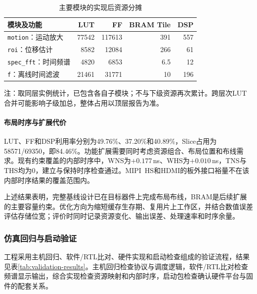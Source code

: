 \documentclass[UTF8,a4paper,zihao=-4,fontset=none]{ctexart}
\renewcommand{\small}{\fontsize{10.5pt}{13pt}\selectfont}
\numberwithin{figure}{section}
\numberwithin{table}{section}
\begin{document}
\begin{table}[htbp]
\centering\small
\caption{主要模块的实现后资源分摊}\label{tab:resource-modules}
\begin{tabular}{@{}lrrrr@{}}
\toprule
模块及功能 & LUT & FF & BRAM Tile & DSP \\
\midrule
\texttt{motion}：运动放大 & 77542 & 117613 & 391 & 557 \\
\texttt{roi}：位移估计 & 8582 & 12084 & 266 & 61 \\
\texttt{spec\_fft}：时间频谱 & 4820 & 6853 & 6.5 & 12 \\
\texttt{f}：离线时间滤波 & 21461 & 31771 & 10 & 196 \\
\bottomrule
\end{tabular}
\par\smallskip
\begin{minipage}{\linewidth}\small
注：取同层实例统计，已包含各自子模块；不与下级资源再次累计。跨层次LUT合并可能影响子级加总，整体占用以顶层报告为准。
\end{minipage}
\end{table}

\paragraph{布局时序与扩展代价}
LUT、FF和DSP利用率分别为49.76\%、37.20\%和40.89\%，Slice占用为58571/69350，即84.46\%。功能扩展需要同时考虑资源组合、布局位置和布线需求。现有约束覆盖的内部时序中，WNS为$+0.177$\,ns、WHS为$+0.010$\,ns，TNS与THS均为0，建立与保持时序检查通过。MIPI~HS和HDMI的板外接口裕量不在该内部时序结果的覆盖范围内。

上述结果表明，完整基线设计已在目标器件上完成布局布线，BRAM是后续扩展的主要容量约束。优化方向为缩短缓存生存期、复用片上工作区，并结合数值误差评估存储位宽；评价时同时记录资源变化、输出误差、处理速率和时序余量。

\subsubsection{仿真回归与启动验证}
工程采用主机回归、软件/RTL比对、硬件实现和启动检查组成的验证流程，结果见表\ref{tab:validation-results}。主机回归检查协议与调度逻辑，软件/RTL比对检查频谱显示输出，综合实现检查资源映射和内部时序，启动包检查确认硬件平台与固件的配套关系。
\end{document}
